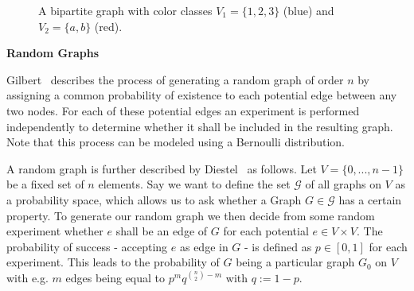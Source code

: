 \begin{figure}[h]
    \centering
    \caption[Example of a bipartite graph]{A bipartite graph with color classes $V_1 = \{1,2,3\}$ (blue) and $V_2=\{a,b\}$ (red).}
    \label{fig:bipartite-colored}
\end{figure}

\textbf{Random Graphs}\par
\label{sec:random-graphs}
Gilbert~\cite{gilbert1959random} describes the process of generating a random graph of order $n$ by assigning a common probability of existence to each potential edge between any two nodes. For each of these potential edges an experiment is performed independently to determine whether it shall be included in the resulting graph. Note that this process can be modeled using a Bernoulli distribution.

A random graph is further described by Diestel~\cite{Diestel2017} as follows. Let $V = \{0,...,n-1\}$ be a fixed set of $n$ elements. Say we want to define the set $\mathcal{G}$ of all graphs on $V$ as a probability space, which allows us to ask whether a Graph $G \in \mathcal{G}$ has a certain property. To generate our random graph we then decide from some random experiment whether $e$ shall be an edge of $G$ for each potential $e \in V \times V$. The probability of success - accepting $e$ as edge in $G$ - is defined as $p \in [0,1]$ for each experiment. This leads to the probability of $G$ being a particular graph $G_0$ on $V$ with e.g. $m$ edges being equal to $p^m q^{\binom{n}{2}-m}$ with $q:=1-p$.
\bigskip

